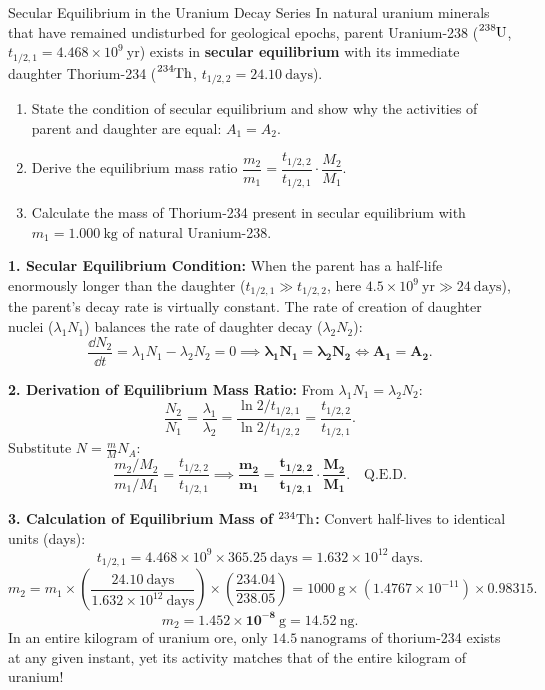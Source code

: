 \begin{exercise}{Secular Equilibrium in the Uranium Decay Series}
In natural uranium minerals that have remained undisturbed for geological epochs, parent Uranium-238 ($\ce{^{238}U}$, $t_{1/2,1} = 4.468 \times 10^9\ \mathrm{yr}$) exists in \textbf{secular equilibrium} with its immediate daughter Thorium-234 ($\ce{^{234}Th}$, $t_{1/2,2} = 24.10\ \mathrm{days}$).
\begin{enumerate}[leftmargin=1.5em,itemsep=2pt]
  \item State the condition of secular equilibrium and show why the activities of parent and daughter are equal: $A_1 = A_2$.
  \item Derive the equilibrium mass ratio $\dfrac{m_2}{m_1} = \dfrac{t_{1/2,2}}{t_{1/2,1}} \cdot \dfrac{M_2}{M_1}$.
  \item Calculate the mass of Thorium-234 present in secular equilibrium with $m_1 = 1.000\ \mathrm{kg}$ of natural Uranium-238.
\end{enumerate}
\end{exercise}

\begin{tabletworkspace}[5.0cm]
\end{tabletworkspace}

\begin{solution}
\textbf{1. Secular Equilibrium Condition:}
When the parent has a half-life enormously longer than the daughter ($t_{1/2,1} \gg t_{1/2,2}$, here $4.5 \times 10^9\ \mathrm{yr} \gg 24\ \mathrm{days}$), the parent's decay rate is virtually constant. The rate of creation of daughter nuclei ($\lambda_1 N_1$) balances the rate of daughter decay ($\lambda_2 N_2$):
\[
\frac{\dd N_2}{\dd t} = \lambda_1 N_1 - \lambda_2 N_2 = 0 \implies \mathbf{\lambda_1 N_1 = \lambda_2 N_2} \iff \mathbf{A_1 = A_2}.
\]

\textbf{2. Derivation of Equilibrium Mass Ratio:}
From $\lambda_1 N_1 = \lambda_2 N_2$:
\[
\frac{N_2}{N_1} = \frac{\lambda_1}{\lambda_2} = \frac{\ln 2 / t_{1/2,1}}{\ln 2 / t_{1/2,2}} = \frac{t_{1/2,2}}{t_{1/2,1}}.
\]
Substitute $N = \frac{m}{M} N_A$:
\[
\frac{m_2 / M_2}{m_1 / M_1} = \frac{t_{1/2,2}}{t_{1/2,1}} \implies \mathbf{\frac{m_2}{m_1} = \frac{t_{1/2,2}}{t_{1/2,1}} \cdot \frac{M_2}{M_1}}. \quad \text{Q.E.D.}
\]

\textbf{3. Calculation of Equilibrium Mass of $^{234}\ce{Th}$:}
Convert half-lives to identical units (days):
\[
t_{1/2,1} = 4.468 \times 10^9 \times 365.25\ \mathrm{days} = 1.632 \times 10^{12}\ \mathrm{days}.
\]
\[
m_2 = m_1 \times \left( \frac{24.10\ \mathrm{days}}{1.632 \times 10^{12}\ \mathrm{days}} \right) \times \left( \frac{234.04}{238.05} \right) = 1000\ \mathrm{g} \times (1.4767 \times 10^{-11}) \times 0.98315.
\]
\[
m_2 = \mathbf{1.452 \times 10^{-8}\ \mathrm{g}} = \mathbf{14.52\ \mathrm{ng}}.
\]
In an entire kilogram of uranium ore, only $14.5\ \mathrm{nanograms}$ of thorium-234 exists at any given instant, yet its activity matches that of the entire kilogram of uranium!
\end{solution}

